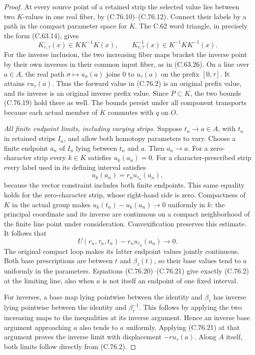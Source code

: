\begin{proof}
At every source point of a retained strip the selected
value lies between two $K$-values in one real fiber,
by (C.76.10)--(C.76.12). Connect their labels by a path
in the compact parameter space for $K$. The C.62 word
triangle, in precisely the form (C.63.14), gives
\[
       K_{r,\tau}(x)\in K K^{-1}K(x),\qquad
       K_{r,\tau}^{-1}(x)\in K^{-1}K K^{-1}(x).
                                                               \tag{C.76.19}
\]
For the inverse inclusion, the two increasing fiber
maps bracket the inverse point by their own inverses
in their common input fiber, as in (C.63.26).
On a line over $a\in A$, the real path
$\sigma\mapsto u_\sigma(a)$ joins $0$ to $u_\tau(a)$
on the prefix $[0,\tau]$. It attains $r u_\tau(a)$.
Thus the forward value in (C.76.2) is an original
prefix value, and its inverse is an original inverse
prefix value. Since $P\subset K$, the two bounds
(C.76.19) hold there as well. The bounds persist under
all component transports because each actual member
of $K$ commutes with $q$ on $O$.

\emph{All finite endpoint limits, including varying strips.}
Suppose $t_n\to a\in A$, with $t_n$ in retained strips
$I_n$, and allow both homotopy parameters to vary.
Choose a finite endpoint $a_n$ of $I_n$ lying between
$t_n$ and $a$. Then $a_n\to a$. For a zero-character
strip every $k\in K$ satisfies $u_k(a_n)=0$.
For a character-prescribed strip every label used
in its defining interval satisfies
\[
                     u_k(a_n)=r_n u_{\tau_n}(a_n),
                                                               \tag{C.76.20}
\]
because the vector constraint includes both finite
endpoints. This same equality holds for the zero-character
strip, whose right-hand side is zero.
Compactness of $K$ in the actual group makes
$u_k(t_n)-u_k(a_n)\to0$ uniformly in $k$: the principal
coordinate and its inverse are continuous on a compact
neighborhood of the finite line point under consideration.
Convexification preserves this estimate. It follows that
\[
         U(r_n,\tau_n,t_n)-r_n u_{\tau_n}(a_n)
                              \longrightarrow0.
                                                               \tag{C.76.21}
\]
The original compact loop makes its latter endpoint
values jointly continuous. Both base prescriptions
are between $t$ and $\beta_\tau(t)$, so their base
values tend to $a$ uniformly in the parameters.
Equations (C.76.20)--(C.76.21) give exactly (C.76.2)
at the limiting line, also when $a$ is not itself an
endpoint of one fixed interval.

For inverses, a base map lying pointwise between the
identity and $\beta_\tau$ has inverse lying pointwise
between the identity and $\beta_\tau^{-1}$. This follows
by applying the two increasing maps to the inequalities
at its inverse argument. Hence an inverse base argument
approaching $a$ also tends to $a$ uniformly. Applying
(C.76.21) at that argument proves the inverse limit
with displacement $-r u_\tau(a)$. Along $A$ itself,
both limits follow directly from (C.76.2).


\end{proof}
